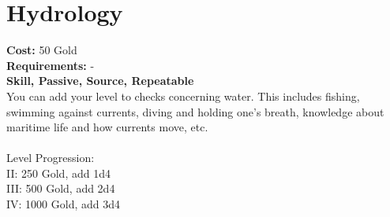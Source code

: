 \section{Hydrology}
\textbf{Cost:} 50 Gold\\
\textbf{Requirements:} -\\
\textbf{Skill, Passive, Source, Repeatable}\\
You can add your level to checks concerning water. This includes fishing, swimming against currents, diving and holding one's breath, knowledge about maritime life and how currents move, etc.\\
\\
Level Progression:\\
II: 250 Gold, add 1d4\\
III: 500 Gold, add 2d4\\
IV: 1000 Gold, add 3d4\\